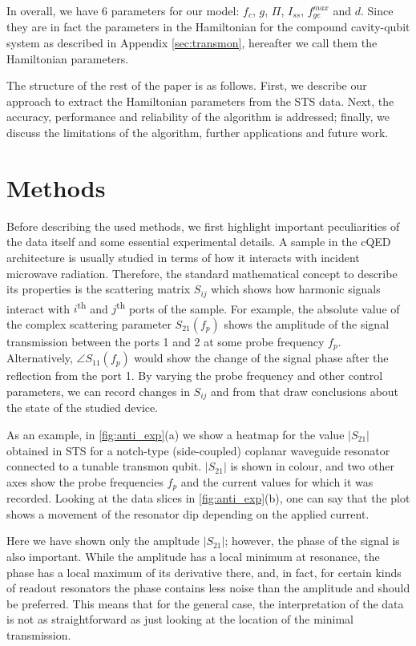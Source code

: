 \documentclass[%
 aip,
 draft,
 amsmath,amssymb,
 reprint,%
]{revtex4-1}
\begin{document}
In overall, we have 6 parameters for our model: $f_c$, $g$, $\Pi$, $I_{ss}$, $f_{ge}^{max}$ and $d$. Since they are in fact the parameters in the Hamiltonian for the compound cavity-qubit system as described in Appendix \ref{sec:transmon}, hereafter we call them the Hamiltonian parameters.

The structure of the rest of the paper is as follows. First, we describe our approach to extract the Hamiltonian parameters from the STS data. Next, the accuracy, performance and reliability of the algorithm is addressed; finally, we discuss the limitations of the algorithm, further applications and future work. 



\section{Methods}

Before describing the used methods, we first highlight important peculiarities of the data itself and some essential experimental details. A sample in the cQED architecture is usually studied in terms of how it interacts with incident microwave radiation. Therefore, the standard mathematical concept to describe its properties is the scattering matrix $S_{ij}$ which shows how harmonic signals interact with $i$\textsuperscript{th} and $j$\textsuperscript{th} ports of the sample. For example, the absolute value of the complex scattering parameter $S_{21}(f_p)$ shows the amplitude of the signal transmission between the ports 1 and 2 at some probe frequency $f_p$. Alternatively, $\angle S_{11}(f_p)$ would show the change of the signal phase after the reflection from the port 1. By varying the probe frequency and other control parameters, we can record changes in $S_{ij}$ and from that draw conclusions about the state of the studied device.

As an example, in \autoref{fig:anti_exp}(a) we show a heatmap for the value $|S_{21}|$ obtained in STS for a notch-type (side-coupled) coplanar waveguide resonator connected to a tunable transmon qubit. $|S_{21}|$ is shown in colour, and two other axes show the probe frequencies $f_p$ and the current values for which it was recorded. Looking at the data slices in \autoref{fig:anti_exp}(b), one can say that the plot shows a movement of the resonator dip depending on the applied current. 

Here we have shown only the ampltude $|S_{21}|$; however, the phase of the signal is also important. While the amplitude has a local minimum at resonance, the phase has a local maximum of its derivative there, and, in fact, for certain kinds of readout resonators the phase contains less noise than the amplitude and should be preferred. This means that for the general case, the interpretation of the data is not as straightforward as just looking at the location of the minimal transmission.
\end{document}
